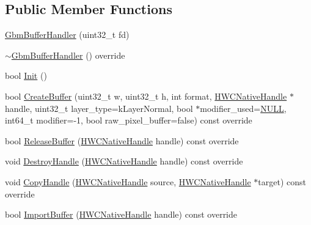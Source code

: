\subsection*{Public Member Functions}
\begin{DoxyCompactItemize}
\item 
\mbox{\hyperlink{classhwcomposer_1_1GbmBufferHandler_a2dd2cbac7542ffaead762e797ab673cc}{Gbm\+Buffer\+Handler}} (uint32\+\_\+t fd)
\item 
\mbox{\hyperlink{classhwcomposer_1_1GbmBufferHandler_a253daef320a4a3376640a5add7f3bc15}{$\sim$\+Gbm\+Buffer\+Handler}} () override
\item 
bool \mbox{\hyperlink{classhwcomposer_1_1GbmBufferHandler_a2338ce2352177ab7a3d01376bcce7381}{Init}} ()
\item 
bool \mbox{\hyperlink{classhwcomposer_1_1GbmBufferHandler_adf982a610866df90e9a2ee4f04801387}{Create\+Buffer}} (uint32\+\_\+t w, uint32\+\_\+t h, int format, \mbox{\hyperlink{alios_2platformdefines_8h_ac0a2eaf260f556d17fe489911f017bdf}{H\+W\+C\+Native\+Handle}} $\ast$handle, uint32\+\_\+t layer\+\_\+type=k\+Layer\+Normal, bool $\ast$modifier\+\_\+used=\mbox{\hyperlink{alios_2platformdefines_8h_a070d2ce7b6bb7e5c05602aa8c308d0c4}{N\+U\+LL}}, int64\+\_\+t modifier=-\/1, bool raw\+\_\+pixel\+\_\+buffer=false) const override
\item 
bool \mbox{\hyperlink{classhwcomposer_1_1GbmBufferHandler_a9c2554d5c2fe0a76b785352754d369a1}{Release\+Buffer}} (\mbox{\hyperlink{alios_2platformdefines_8h_ac0a2eaf260f556d17fe489911f017bdf}{H\+W\+C\+Native\+Handle}} handle) const override
\item 
void \mbox{\hyperlink{classhwcomposer_1_1GbmBufferHandler_a0786f7b82b504105c71881eced9b5270}{Destroy\+Handle}} (\mbox{\hyperlink{alios_2platformdefines_8h_ac0a2eaf260f556d17fe489911f017bdf}{H\+W\+C\+Native\+Handle}} handle) const override
\item 
void \mbox{\hyperlink{classhwcomposer_1_1GbmBufferHandler_ae730a1b13a177dcf02084c0c60bcafb6}{Copy\+Handle}} (\mbox{\hyperlink{alios_2platformdefines_8h_ac0a2eaf260f556d17fe489911f017bdf}{H\+W\+C\+Native\+Handle}} source, \mbox{\hyperlink{alios_2platformdefines_8h_ac0a2eaf260f556d17fe489911f017bdf}{H\+W\+C\+Native\+Handle}} $\ast$target) const override
\item 
bool \mbox{\hyperlink{classhwcomposer_1_1GbmBufferHandler_a552812693a793705e94138855daaead0}{Import\+Buffer}} (\mbox{\hyperlink{alios_2platformdefines_8h_ac0a2eaf260f556d17fe489911f017bdf}{H\+W\+C\+Native\+Handle}} handle) const override

\end{DoxyCompactItemize}
